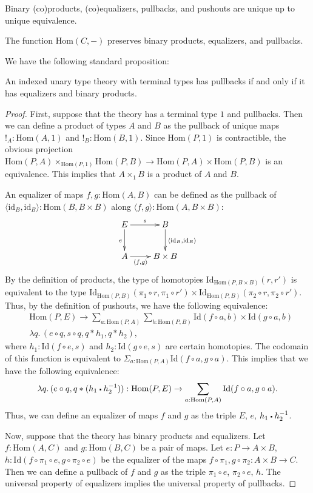 \documentclass[reqno]{amsart}
\theoremstyle{definition}
\theoremstyle{remark}
\newcommand{\fs}[1]{\mathrm{#1}}
\newcommand{\Hom}{\fs{Hom}}
\newcommand{\Id}{\fs{Id}}
\newcommand{\sym}[1]{#1^{-1}}
\newcommand{\id}{\fs{id}}
\numberwithin{figure}{section}
\newcommand{\ct}{%
  \mathchoice{\mathbin{\raisebox{0.25ex}{$\displaystyle\centerdot$}}}%
             {\mathbin{\raisebox{0.25ex}{$\centerdot$}}}%
             {\mathbin{\raisebox{0.25ex}{$\scriptstyle\,\centerdot\,$}}}%
             {\mathbin{\raisebox{0.25ex}{$\scriptscriptstyle\,\centerdot\,$}}}
}
\begin{document}
\begin{remark}
Binary (co)products, (co)equalizers, pullbacks, and pushouts are unique up to unique equivalence.
\end{remark}

\begin{remark}
The function $\Hom(C,-)$ preserves binary products, equalizers, and pullbacks.
\end{remark}

We have the following standard proposition:

\begin{prop}
An indexed unary type theory with terminal types has pullbacks if and only if it has equalizers and binary products.
\end{prop}
\begin{proof}
First, suppose that the theory has a terminal type $1$ and pullbacks.
Then we can define a product of types $A$ and $B$ as the pullback of unique maps $!_A : \Hom(A,1)$ and $!_B : \Hom(B,1)$.
Since $\Hom(P,1)$ is contractible, the obvious projection $\Hom(P,A) \times_{\Hom(P,1)} \Hom(P,B) \to \Hom(P,A) \times \Hom(P,B)$ is an equivalence.
This implies that $A \times_1 B$ is a product of $A$ and $B$.

An equalizer of maps $f,g : \Hom(A,B)$ can be defined as the pullback of $\langle \id_B, \id_B \rangle : \Hom(B, B \times B)$ along $\langle f, g \rangle : \Hom(A, B \times B)$:
\[ \xymatrix{ E \ar[r]^s \ar[d]_e & B \ar[d]^{\langle \id_B, \id_B \rangle} \\
              A \ar[r]_-{\langle f, g \rangle} & B \times B
            } \]
By the definition of products, the type of homotopies $\Id_{\Hom(P, B \times B)}(r,r')$ is equivalent to the type $\Id_{\Hom(P,B)}(\pi_1 \circ r, \pi_1 \circ r') \times \Id_{\Hom(P,B)}(\pi_2 \circ r, \pi_2 \circ r')$.
Thus, by the definition of pushouts, we have the following equivalence:
\begin{align*}
& \Hom(P,E) \to \sum_{a : \Hom(P,A)} \sum_{b : \Hom(P,B)} \Id(f \circ a, b) \times \Id(g \circ a, b) \\
& \lambda q.\,(e \circ q, s \circ q, q * h_1, q * h_2),
\end{align*}
where $h_1 : \Id(f \circ e, s)$ and $h_2 : \Id(g \circ e, s)$ are certain homotopies.
The codomain of this function is equivalent to $\Sigma_{a : \Hom(P,A)} \Id(f \circ a, g \circ a)$.
This implies that we have the following equivalence:
\[ \lambda q.\,(e \circ q, q * (h_1 \ct \sym{h_2})) : \Hom(P,E) \to \sum_{a : \Hom(P,A)} \Id(f \circ a, g \circ a). \]
Thus, we can define an equalizer of maps $f$ and $g$ as the triple $E$, $e$, $h_1 \ct \sym{h_2}$.

Now, suppose that the theory has binary products and equalizers.
Let $f : \Hom(A,C)$ and $g : \Hom(B,C)$ be a pair of maps.
Let $e : P \to A \times B$, $h : \Id(f \circ \pi_1 \circ e, g \circ \pi_2 \circ e)$ be the equalizer of the maps $f \circ \pi_1, g \circ \pi_2 : A \times B \to C$.
Then we can define a pullback of $f$ and $g$ as the triple $\pi_1 \circ e$, $\pi_2 \circ e$, $h$.
The universal property of equalizers implies the universal property of pullbacks.
\end{proof}
\end{document}
